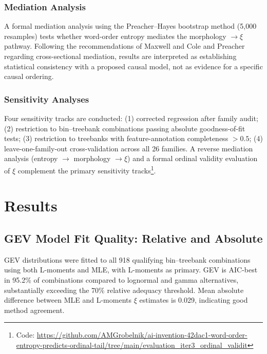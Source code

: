 \documentclass[11pt,letterpaper]{article}
\begin{document}
\subsubsection{Mediation Analysis}

A formal mediation analysis using the Preacher--Hayes bootstrap method (5,000 resamples) \cite{Preacher2015} tests whether word-order entropy mediates the morphology $\rightarrow \xi$ pathway. Following the recommendations of Maxwell and Cole \cite{Maxwell2007} and Preacher \cite{Preacher2015} regarding cross-sectional mediation, results are interpreted as establishing statistical consistency with a proposed causal model, not as evidence for a specific causal ordering.

\subsubsection{Sensitivity Analyses}\label{sec:sensitivity_methods}

Four sensitivity tracks are conducted: (1) corrected regression after family audit; (2) restriction to bin--treebank combinations passing absolute goodness-of-fit tests; (3) restriction to treebanks with feature-annotation completeness $> 0.5$; (4) leave-one-family-out cross-validation across all 26 families. A reverse mediation analysis (entropy $\rightarrow$ morphology $\rightarrow \xi$) and a formal ordinal validity evaluation of $\xi$ complement the primary sensitivity tracks\footnote{Code: \url{https://github.com/AMGrobelnik/ai-invention-42dac1-word-order-entropy-predicts-ordinal-tail/tree/main/evaluation_iter3_ordinal_validit}}.

\section{Results}\label{sec:results}

\subsection{GEV Model Fit Quality: Relative and Absolute}

GEV distributions were fitted to all 918 qualifying bin--treebank combinations using both L-moments and MLE, with L-moments as primary. GEV is AIC-best in 95.2\% of combinations compared to lognormal and gamma alternatives, substantially exceeding the 70\% relative adequacy threshold. Mean absolute difference between MLE and L-moments $\xi$ estimates is 0.029, indicating good method agreement.
\end{document}
